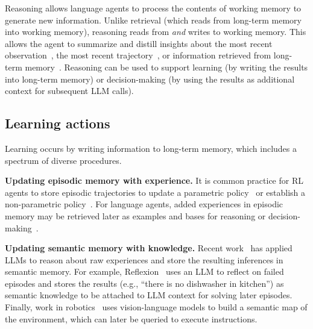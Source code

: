 \documentclass[10pt]{article} %
\begin{document}
Reasoning allows language agents to process the contents of working memory to generate new information. Unlike retrieval (which reads from long-term memory into working memory), reasoning reads from \emph{and} writes to working memory. This allows the agent to summarize and distill insights about the most recent observation~\citep{yao2022react, peng2023language}, the most recent trajectory~\citep{shinn2023reflexion}, or information retrieved from long-term memory~\citep{park2023generative}. Reasoning can be used to support learning (by writing the results into long-term memory) or decision-making (by using the results as additional context for subsequent LLM calls). 


\subsection{Learning actions} \label{sec:learning}

Learning occurs by writing information to long-term memory, which includes a spectrum of diverse procedures.


\textbf{Updating episodic memory with experience.} It is common practice for RL agents to store episodic trajectories to update a parametric policy~\citep{blundell2016model, pritzel2017neural} or establish a non-parametric policy~\citep{ecoffet2019go, tuyls2022multi}. For language agents, added experiences in episodic memory may be retrieved later as examples and bases for reasoning or decision-making~\citep{weston2014memory, rubin2021learning, park2023generative}. 

\textbf{Updating semantic memory with knowledge.} 
 Recent work~\citep{shinn2023reflexion, park2023generative} has applied LLMs to reason about raw experiences and store the resulting inferences in semantic memory. For example, Reflexion~\citep{shinn2023reflexion} uses an LLM to reflect on failed episodes and stores the results (e.g., ``there is no dishwasher in kitchen'') as semantic knowledge to be attached to LLM context for solving later episodes. Finally, work in robotics~\citep{chen2023open} uses vision-language models to build a semantic map of the environment, which can later be queried to execute instructions.
\end{document}
